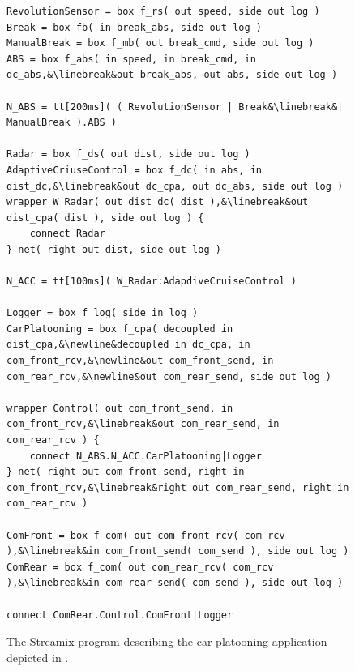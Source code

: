 \begin{figure}[bht]
    \TopFigSpace
\begin{lstlisting}
RevolutionSensor = box f_rs( out speed, side out log )
Break = box fb( in break_abs, side out log )
ManualBreak = box f_mb( out break_cmd, side out log )
ABS = box f_abs( in speed, in break_cmd, in dc_abs,&\linebreak&out break_abs, out abs, side out log )

N_ABS = tt[200ms]( ( RevolutionSensor | Break&\linebreak&| ManualBreak ).ABS )

Radar = box f_ds( out dist, side out log )
AdaptiveCriuseControl = box f_dc( in abs, in dist_dc,&\linebreak&out dc_cpa, out dc_abs, side out log )
wrapper W_Radar( out dist_dc( dist ),&\linebreak&out dist_cpa( dist ), side out log ) {
    connect Radar
} net( right out dist, side out log )

N_ACC = tt[100ms]( W_Radar:AdapdiveCruiseControl )

Logger = box f_log( side in log )
CarPlatooning = box f_cpa( decoupled in dist_cpa,&\newline&decoupled in dc_cpa, in com_front_rcv,&\newline&out com_front_send, in com_rear_rcv,&\newline&out com_rear_send, side out log )

wrapper Control( out com_front_send, in com_front_rcv,&\linebreak&out com_rear_send, in com_rear_rcv ) {
    connect N_ABS.N_ACC.CarPlatooning|Logger
} net( right out com_front_send, right in com_front_rcv,&\linebreak&right out com_rear_send, right in com_rear_rcv )

ComFront = box f_com( out com_front_rcv( com_rcv ),&\linebreak&in com_front_send( com_send ), side out log )
ComRear = box f_com( out com_rear_rcv( com_rcv ),&\linebreak&in com_rear_send( com_send ), side out log )

connect ComRear.Control.ComFront|Logger
\end{lstlisting}
    \CaptionListSpace
    \caption{The Streamix program describing the car platooning application depicted in \Fig{\ref{fig_smx_cpa}}.}
    \label{list_cpa_net}
    \BotFigSpace
\end{figure}

